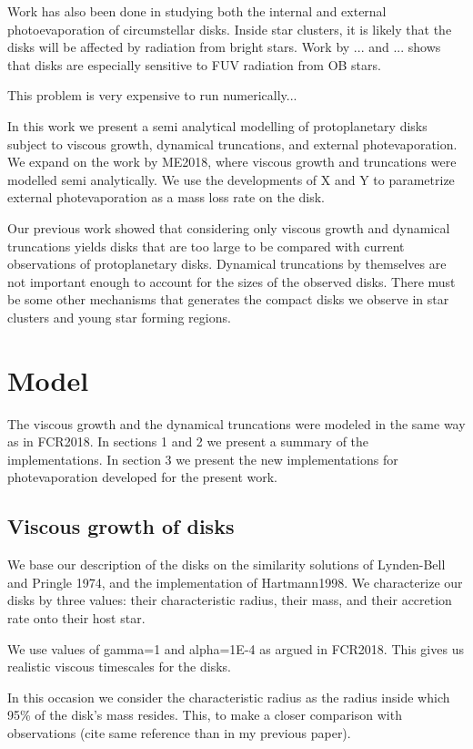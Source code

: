 \documentclass[fleqn,usenatbib]{mnras}
\begin{document}
Work has also been done in studying both the internal and external photoevaporation of circumstellar disks. Inside star clusters, it is likely that the disks will be affected by radiation from bright stars. Work by ... and ... shows that disks are especially sensitive to FUV radiation from OB stars.

This problem is very expensive to run numerically...

In this work we present a semi analytical modelling of protoplanetary disks subject to viscous growth, dynamical truncations, and external photevaporation. We expand on the work by ME2018, where viscous growth and truncations were modelled semi analytically. We use the developments of X and Y to parametrize external photevaporation as a mass loss rate on the disk.

Our previous work showed that considering only viscous growth and dynamical truncations yields disks that are too large to be compared with current observations of protoplanetary disks. Dynamical truncations by themselves are not important enough to account for the sizes of the observed disks. There must be some other mechanisms that generates the compact disks we observe in star clusters and young star forming regions.


\section{Model}
\label{sec:model}

The viscous growth and the dynamical truncations were modeled in the same way as in FCR2018. In sections 1 and 2 we present a summary of the implementations. In section 3 we present the new implementations for photevaporation developed for the present work.

\subsection{Viscous growth of disks}

We base our description of the disks on the similarity solutions of Lynden-Bell and Pringle 1974, and the implementation of Hartmann1998. We characterize our disks by three values: their characteristic radius, their mass, and their accretion rate onto their host star.

We use values of gamma=1 and alpha=1E-4 as argued in FCR2018. This gives us realistic viscous timescales for the disks.

In this occasion we consider the characteristic radius as the radius inside which 95\% of the disk's mass resides. This, to make a closer comparison with observations (cite same reference than in my previous paper).
\end{document}
